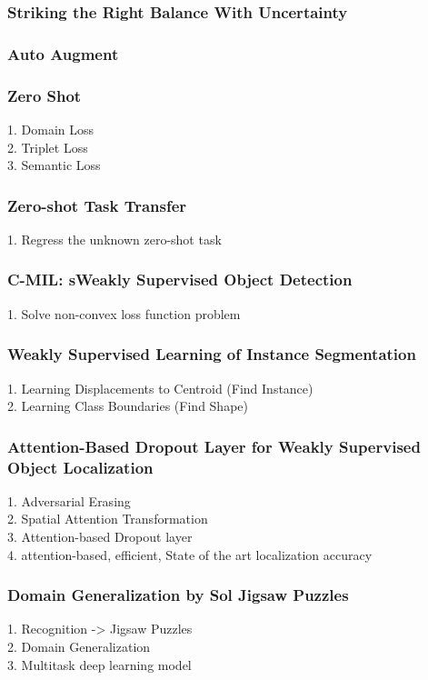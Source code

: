 \subsubsection{Striking the Right Balance With Uncertainty}
\subsubsection{Auto Augment}
\subsubsection{Zero Shot}
    1. Domain Loss \\
    2. Triplet Loss \\
    3. Semantic Loss \\
\subsubsection{Zero-shot Task Transfer}
    1. Regress the unknown zero-shot task \\
\subsubsection{C-MIL: sWeakly Supervised Object Detection}
    1. Solve non-convex loss function problem \\
\subsubsection{Weakly Supervised Learning of Instance Segmentation}
    1. Learning Displacements to Centroid (Find Instance) \\
    2. Learning Class Boundaries (Find Shape) \\
\subsubsection{Attention-Based Dropout Layer for Weakly Supervised Object Localization}
    1. Adversarial Erasing \\
    2. Spatial Attention Transformation \\
    3. Attention-based Dropout layer \\
    4. attention-based, efficient, State of the art localization accuracy \\
\subsubsection{Domain Generalization by Sol Jigsaw Puzzles}
    1. Recognition -> Jigsaw Puzzles \\
    2. Domain Generalization \\
    3. Multitask deep learning model \\
